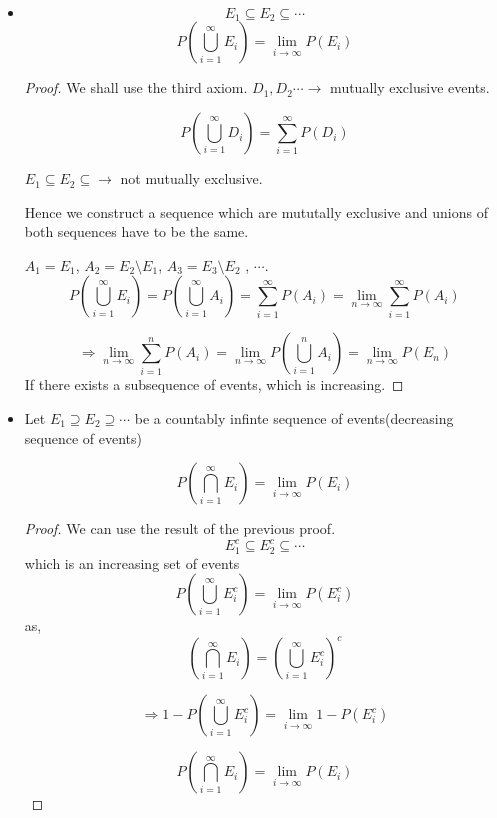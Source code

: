 \documentclass{article}
\begin{document}
\begin{itemize}
    \item $$E_1 \subseteq E_2 \subseteq \cdots$$
    $$P(\bigcup_{i=1}^{\infty} E_i)= \lim_{i \to \infty} P(E_i)$$

    \begin{proof}
        We shall use the third axiom.
        $D_1, D_2 \cdots \rightarrow$ mutually exclusive events.

        $$ P(\bigcup_{i=1}^{\infty} D_i)= \sum_{i=1}^{\infty}P(D_i)$$

        $E_1 \subseteq E_2 \subseteq \rightarrow $ not mutually exclusive.

        Hence we construct a sequence which are mututally exclusive and unions of both sequences have to be the same.

        $A_1=E_1$, $A_2=E_2\setminus E_1$, $ A_3=E_3 \setminus E_2$ , $\cdots$.
        $$ P(\bigcup_{i=1}^{\infty} E_i)= P(\bigcup_{i=1}^{\infty} A_i)= \sum_{i=1}^{\infty}P(A_i)= \lim_{n \to \infty} \sum_{i=1}^{\infty}P(A_i)$$

        $$\Rightarrow \lim_{n \to \infty} \sum_{i=1}^{n} P(A_i)= \lim_{n \to \infty} P(\bigcup_{i=1}^{n}A_i)= \lim_{n \to \infty}P(E_n)$$
        If there exists a subsequence of events, which is increasing.

    \end{proof}

    \item Let $E_1 \supseteq E_2 \supseteq \cdots$ be a countably infinte sequence of events(decreasing sequence of events)

    $$P(\bigcap_{i=1}^{\infty}E_i)=\lim_{i \to \infty} P(E_i)$$

    \begin{proof}
        We can use the result of the previous proof.
        $$ E_1^c \subseteq E_2^c \subseteq \cdots$$
        which is an increasing set of events
        $$P(\bigcup_{i=1}^{\infty} E_i^c)= \lim_{i \to \infty}P(E_i^c)$$
        as,
        $$ \left(\bigcap_{i=1}^{\infty} E_i \right)= \left( \bigcup_{i=1}^{\infty} E_i^c \right)^c $$

        $$\Rightarrow 1- P(\bigcup_{i=1}^{\infty} E_i^c)= \lim_{i \to \infty}1- P(E_i^c)$$

        $$P \left(\bigcap_{i=1}^{\infty} E_i \right) = \lim_{i \to \infty }P(E_i)$$

    \end{proof}

\end{itemize}
\end{document}
